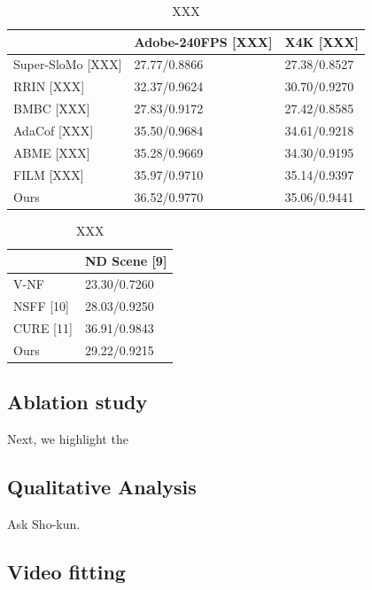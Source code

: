 \documentclass{article}
\begin{document}
\begin{table}[]
\caption{XXX}
\begin{tabular}{l | l | l }
 &  Adobe-240FPS  [XXX] &  X4K [XXX]  \\
\hline
Super-SloMo [XXX] &  27.77/0.8866 & 27.38/0.8527  \\
RRIN [XXX]  & 32.37/0.9624 & 30.70/0.9270  \\
BMBC [XXX]  & 27.83/0.9172 & 27.42/0.8585   \\
AdaCof [XXX] & 35.50/0.9684 & 34.61/0.9218 \\
ABME   [XXX] & 35.28/0.9669 & 34.30/0.9195 \\
FILM   [XXX] &	35.97/0.9710 & 35.14/0.9397 \\
Ours	& 36.52/0.9770 & 35.06/0.9441 \\
\end{tabular}

\end{table}



\begin{table}[]
\caption{XXX}
\begin{tabular}{l | l }
	    &   ND Scene [9] \\
\hline
V-NF        &  23.30/0.7260\\
NSFF [10]   & 28.03/0.9250\\
CURE [11]   & 36.91/0.9843\\
Ours	    &  29.22/0.9215
\end{tabular}

\end{table}



\subsection{Ablation study}

Next, we highlight the



\subsection{Qualitative Analysis}

%
Ask Sho-kun.

\subsection{Video fitting}
\end{document}
